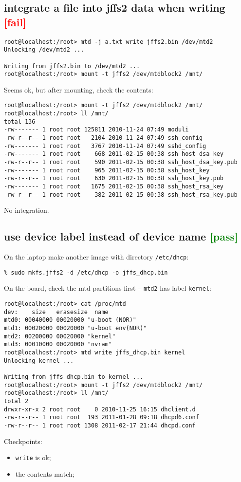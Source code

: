 \documentclass[a4paper]{report}
\begin{document}
\subsection{integrate a file into jffs2 data when writing \textcolor{red}{[fail]}}
\begin{lstlisting}
root@localhost:/root> mtd -j a.txt write jffs2.bin /dev/mtd2
Unlocking /dev/mtd2 ...

Writing from jffs2.bin to /dev/mtd2 ...     
root@localhost:/root> mount -t jffs2 /dev/mtdblock2 /mnt/
\end{lstlisting}
Seems ok, but after mounting, check the contents:
\begin{lstlisting}
root@localhost:/root> mount -t jffs2 /dev/mtdblock2 /mnt/
root@localhost:/root> ll /mnt/
total 136
-rw------- 1 root root 125811 2010-11-24 07:49 moduli
-rw-r--r-- 1 root root   2104 2010-11-24 07:49 ssh_config
-rw------- 1 root root   3767 2010-11-24 07:49 sshd_config
-rw------- 1 root root    668 2011-02-15 00:38 ssh_host_dsa_key
-rw-r--r-- 1 root root    590 2011-02-15 00:38 ssh_host_dsa_key.pub
-rw------- 1 root root    965 2011-02-15 00:38 ssh_host_key
-rw-r--r-- 1 root root    630 2011-02-15 00:38 ssh_host_key.pub
-rw------- 1 root root   1675 2011-02-15 00:38 ssh_host_rsa_key
-rw-r--r-- 1 root root    382 2011-02-15 00:38 ssh_host_rsa_key.pub
\end{lstlisting}
No integration.
\subsection{use device label instead of device name \textcolor{green}{[pass]}}
On the laptop make another image with directory {\tt /etc/dhcp}:
\begin{lstlisting}
% sudo mkfs.jffs2 -d /etc/dhcp -o jffs_dhcp.bin
\end{lstlisting}
On the board, check the mtd partitions first -- {\tt mtd2} has label {\tt kernel}:
\begin{lstlisting}
root@localhost:/root> cat /proc/mtd 
dev:    size   erasesize  name
mtd0: 00040000 00020000 "u-boot (NOR)"
mtd1: 00020000 00020000 "u-boot env(NOR)"
mtd2: 00200000 00020000 "kernel"
mtd3: 00010000 00020000 "nvram"
root@localhost:/root> mtd write jffs_dhcp.bin kernel
Unlocking kernel ...

Writing from jffs_dhcp.bin to kernel ...     
root@localhost:/root> mount -t jffs2 /dev/mtdblock2 /mnt/
root@localhost:/root> ll /mnt/
total 2
drwxr-xr-x 2 root root    0 2010-11-25 16:15 dhclient.d
-rw-r--r-- 1 root root  193 2011-01-28 09:18 dhcpd6.conf
-rw-r--r-- 1 root root 1308 2011-02-17 21:44 dhcpd.conf
\end{lstlisting}
Checkpoints:
\begin{itemize}
    \item {\tt write} is ok;
    \item the contents match;
\end{itemize}
\end{document}
